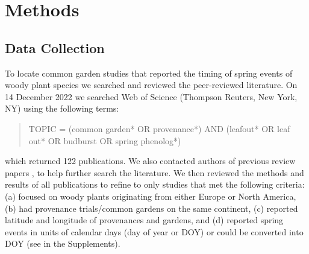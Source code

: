 \documentclass{article}
\begin{document}
 

\section{Methods}
\subsection{Data Collection}
To locate common garden studies that reported the timing of spring events of woody plant species we searched and reviewed the peer-reviewed literature. On 14 December 2022 we searched Web of Science (Thompson Reuters, New York, NY) using the following terms:
\begin{quote}
TOPIC = (common garden* OR provenance*) AND (leafout* OR leaf out* OR budburst OR spring phenolog*)
\end{quote}
which returned 122 publications. We also contacted authors of previous review papers \citep{AitkenBemmels16, Alberto13}, to help further search the literature. We then reviewed the methods and results of all publications to refine to only studies that met the following criteria: (a) focused on woody plants originating from either Europe or North America, (b) had provenance trials/common gardens on the same continent, (c) reported latitude and longitude of provenances and gardens, and (d) reported spring events in units of calendar days (day of year or DOY) or could be converted into DOY (see  in the Supplements).
\end{document}
